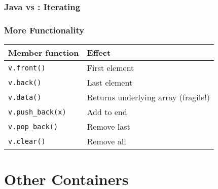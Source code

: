\begin{frame}
  \frametitle{Java vs \cpp: Iterating}
  \vskip2mm
  \structure{\cpp}
\end{frame}

\begin{frame}
  \frametitle{More Functionality}
  \begin{center}
    \begin{tabular}{ll}
      \textbf{Member function} & \textbf{Effect} \\
      \toprule
      \texttt{v.front()}       & First element \\
      \texttt{v.back()}        & Last element \\
      \texttt{v.data()}        & Returns underlying array (fragile!) \\
      \texttt{v.push\_back(x)} & Add to end \\
      \texttt{v.pop\_back()}   & Remove last \\
      \texttt{v.clear()}       & Remove all \\
    \end{tabular}
  \end{center}
\end{frame}


\section{Other Containers}

\frame{\tableofcontents[currentsection]}

